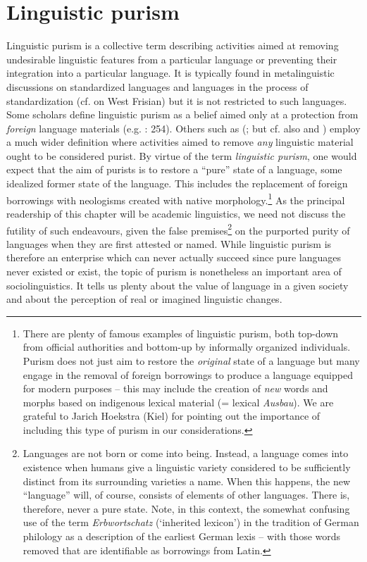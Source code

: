\documentclass[output=paper]{langsci/langscibook}
\begin{document}
\section{Linguistic purism}
\label{sec:gregersen:2}

Linguistic purism is a collective term describing activities aimed at removing undesirable linguistic features from a particular language or preventing their integration into a particular language. It is typically found in metalinguistic discussions on standardized languages and languages in the process of standardization (cf. \citealt{Feitsma2002} on West Frisian) but it is not restricted to such languages. Some scholars define linguistic purism as a belief aimed only at a protection from \textit{foreign} language materials (e.g. \citealt{Trask1999}: 254). Others such as \citeauthor{Thomas1991} (\citeyear{Thomas1991}; but cf. also \citealt{LangerDavies2005} and \citealt{LangerNesse2012}) employ a much wider definition where activities aimed to remove \textit{any} linguistic material ought to be considered purist. By virtue of the term \textit{linguistic purism}, one would expect that the aim of purists is to restore a “pure” state of a language, some idealized former state of the language. This includes the replacement of foreign borrowings with neologisms created with native morphology.\footnote{There are plenty of famous examples of linguistic purism, both top-down from official authorities and bottom-up by informally organized individuals. Purism does not just aim to restore the \textit{original} state of a language but many engage in the removal of foreign borrowings to produce a language equipped for modern purposes – this may include the creation of \textit{new} words and morphs based on indigenous lexical material (= lexical \textit{Ausbau}). We are grateful to Jarich Hoekstra (Kiel) for pointing out the importance of including this type of purism in our considerations.} As the principal readership of this chapter will be academic linguistics, we need not discuss the futility of such endeavours, given the false premises\footnote{Languages are not born or come into being. Instead, a language comes into existence when humans give a linguistic variety considered to be sufficiently distinct from its surrounding varieties a name. When this happens, the new “language” will, of course, consists of elements of other languages. There is, therefore, never a pure state. Note, in this context, the somewhat confusing use of the term \textit{Erbwortschatz} (‘inherited lexicon’) in the tradition of German philology as a description of the earliest German lexis – with those words removed that are identifiable as borrowings from Latin.} on the purported purity of languages when they are first attested or named. While linguistic purism is therefore an enterprise which can never actually succeed since pure languages never existed or exist, the topic of purism is nonetheless an important area of sociolinguistics. It tells us plenty about the value of language in a given society and about the perception of real or imagined linguistic changes.
\end{document}
